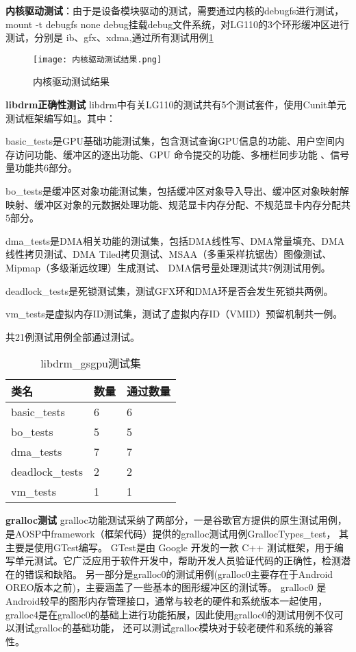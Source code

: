 \textbf{内核驱动测试}：由于是设备模块驱动的测试，需要通过内核的debugfs进行测试，mount -t debugfs none debug挂载debug文件系统，对LG110的3个环形缓冲区进行测试，分别是
ib、gfx、xdma,通过所有测试用例\ref{fig:内核驱动测试结果}

\begin{figure}[h]
    \centering
    \texttt{[image: 内核驱动测试结果.png]}
    \caption{内核驱动测试结果}
    \label{fig:内核驱动测试结果}
\end{figure}

\textbf{libdrm正确性测试}
libdrm中有关LG110的测试共有5个测试套件，使用Cunit单元测试框架编写如\ref{tab:libdrm_gsgpu测试集}。其中：

basic\_tests是GPU基础功能测试集，包含测试查询GPU信息的功能、用户空间内存访问功能、缓冲区的逐出功能、GPU 命令提交的功能、多栅栏同步功能 、信号量功能共6部分。

bo\_tests是缓冲区对象功能测试集，包括缓冲区对象导入导出、缓冲区对象映射解映射、缓冲区对象的元数据处理功能、规范显卡内存分配、不规范显卡内存分配共5部分。

dma\_tests是DMA相关功能的测试集，包括DMA线性写、DMA常量填充、DMA线性拷贝测试、DMA Tiled拷贝测试、MSAA（多重采样抗锯齿）图像测试、Mipmap（多级渐远纹理）生成测试、
DMA信号量处理测试共7例测试用例。

deadlock\_tests是死锁测试集，测试GFX环和DMA环是否会发生死锁共两例。

vm\_tests是虚拟内存ID测试集，测试了虚拟内存ID（VMID）预留机制共一例。

共21例测试用例全部通过测试。

\begin{table}[h]
    \centering
    \caption{libdrm\_gsgpu测试集}
    \label{tab:libdrm_gsgpu测试集}
    \begin{tabular}{lll}
      \toprule
      类名   &  数量  &通过数量\\
      \midrule
      basic\_tests & 6 & 6\\
      bo\_tests & 5 & 5\\
      dma\_tests & 7 & 7\\
      deadlock\_tests & 2 &2\\
      vm\_tests & 1 &1\\
      \bottomrule
    \end{tabular}
    \note{}
\end{table}

\textbf{gralloc测试}
gralloc功能测试采纳了两部分，一是谷歌官方提供的原生测试用例，是AOSP中framework（框架代码）提供的gralloc测试用例GrallocTypes\_test，
其主要是使用GTest编写。
GTest\cite{GoogleTest}是由 Google 开发的一款 C++ 测试框架，用于编写单元测试。它广泛应用于软件开发中，帮助开发人员验证代码的正确性，检测潜在的错误和缺陷。
另一部分是gralloc0的测试用例(gralloc0主要存在于Android OREO版本之前)，主要涵盖了一些基本的图形缓冲区的测试等。
gralloc0 是Android较早的图形内存管理接口，通常与较老的硬件和系统版本一起使用，gralloc4是在gralloc0的基础上进行功能拓展，因此使用gralloc0的测试用例不仅可以测试gralloc的基础功能，
还可以测试gralloc模块对于较老硬件和系统的兼容性。


